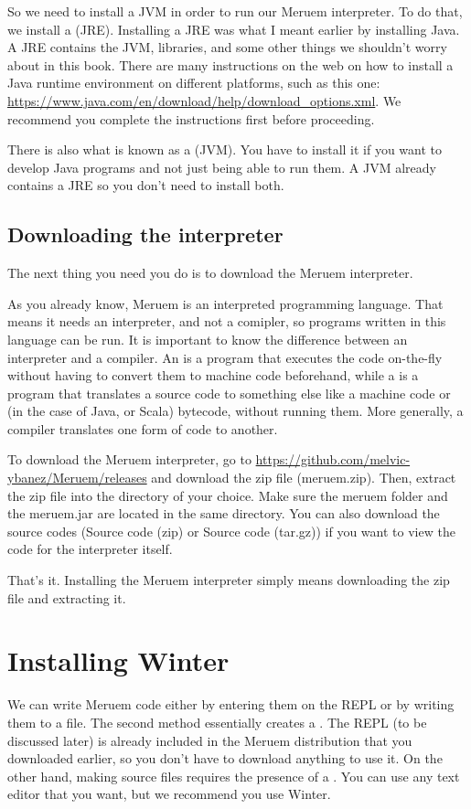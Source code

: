 So we need to install a JVM in order to run our Meruem interpreter. To do that, we install a  (JRE). Installing a JRE was what I meant earlier by installing Java. A JRE contains the JVM, libraries, and some other things we shouldn't worry about in this book. There are many instructions on the web on how to install a Java runtime environment on different platforms, such as this one: \url{ https://www.java.com/en/download/help/download_options.xml}. We recommend you complete the instructions first before proceeding.

\begin{noteparagraph}
There is also what is known as a  (JVM). You have to install it if you want to develop Java programs and not just being able to run them. A JVM already contains a JRE so you don't need to install both.
\end{noteparagraph}

\subsection{Downloading the interpreter}
The next thing you need you do is to download the Meruem interpreter. 

As you already know, Meruem is an interpreted programming language. That means it needs an interpreter, and not a comipler, so programs written in this language can be run. It is important to know the difference between an interpreter and a compiler. An  is a program that executes the code on-the-fly without having to convert them to machine code beforehand, while a  is a program that translates a source code to something else like a machine code or (in the case of Java, or Scala) bytecode, without running them. More generally, a compiler translates one form of code to another.

To download the Meruem interpreter, go to \url{https://github.com/melvic-ybanez/Meruem/releases} and download the zip file (meruem.zip). Then, extract the zip file into the directory of your choice. Make sure the meruem folder and the meruem.jar are located in the same directory. You can also download the source codes (Source code (zip) or Source code (tar.gz)) if you want to view the code for the interpreter itself. 

That's it. Installing the Meruem interpreter simply means downloading the zip file and extracting it. 

\section{Installing Winter}
We can write Meruem code either by entering them on the REPL or by writing them to a file. The second method essentially creates a . The REPL (to be discussed later) is already included in the Meruem distribution that you downloaded earlier, so you don't have to download anything to use it. On the other hand, making source files requires the presence of a . You can use any text editor that you want, but we recommend you use Winter. 

